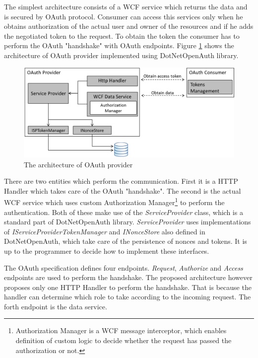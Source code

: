 The simplest architecture consists of a WCF service which returns the data and is secured by OAuth protocol. Consumer can access this services only when he obtains authorization of the actual user and owner of the resources and if he adds the negotiated token to the request. To obtain the token the consumer has to perform the OAuth "handshake" with OAuth endpoints. Figure \ref{fig:oauth_composition} shows the architecture of OAuth provider implemented using DotNetOpenAuth library.

\begin{figure}[h]
\begin{center}
\includegraphics[width=14cm]{figures/oauth_composition}
\caption{The architecture of OAuth provider}
\label{fig:oauth_composition}
\end{center}
\end{figure}

There are two entities which perform the communication. First it is a HTTP Handler which takes care of the OAuth "handshake". The second is the actual WCF service which uses custom Authorization Manager\footnote{Authorization Manager is a WCF message interceptor, which enables definition of custom logic to decide whether the request has passed the authorization or not.} to perform the authentication. Both of these make use of the \textit{ServiceProvider} class, which is a standard part of DotNetOpenAuth library. \textit{ServiceProvider} uses implementations of \textit{IServiceProviderTokenManager} and \textit{INonceStore} also defined in DotNetOpenAuth, which take care of the persistence of nonces and tokens. It is up to the programmer to decide how to implement these interfaces.

The OAuth specification defines four endpoints. \textit{Request}, \textit{Authorize} and \textit{Access} endpoints are used to perform the handshake. The proposed architecture however proposes only one HTTP Handler to perform the handshake. That is because the handler can determine which role to take according to the incoming request. The forth endpoint is the data service.

